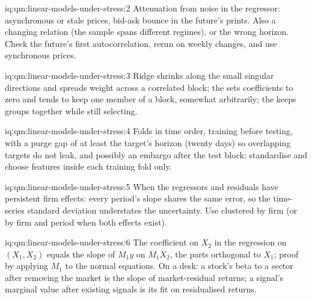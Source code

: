 \begin{solution}{iq:qm:linear-models-under-stress:2}
Attenuation from noise in the regressor: asynchronous or stale prices, bid-ask bounce in the future's prints. Also a changing relation (the
sample spans different regimes), or the wrong horizon. Check the future's first autocorrelation, rerun on weekly changes, and use synchronous
prices.
\end{solution}

\begin{solution}{iq:qm:linear-models-under-stress:3}
Ridge shrinks along the small singular directions and spreads weight across a correlated block; the  sets coefficients to zero and tends to
keep one member of a block, somewhat arbitrarily; the  keeps groups together while still selecting.
\end{solution}

\begin{solution}{iq:qm:linear-models-under-stress:4}
Folds in time order, training before testing, with a purge gap of at least the target's horizon (twenty days) so overlapping targets do not leak,
and possibly an embargo after the test block; standardise and choose features inside each training fold only.
\end{solution}

\begin{solution}{iq:qm:linear-models-under-stress:5}
When the regressors and residuals have persistent firm effects: every period's slope shares the same error, so the time-series standard deviation
understates the uncertainty. Use  clustered by firm (or by firm and period when both effects exist).
\end{solution}

\begin{solution}{iq:qm:linear-models-under-stress:6}
The coefficient on $X_2$ in the regression on $(X_1, X_2)$ equals the slope of $M_1y$ on $M_1X_2$, the parts orthogonal to $X_1$; proof by applying
$M_1$ to the normal equations. On a desk: a stock's beta to a sector after removing the market is the slope of market-residual returns; a signal's
marginal value after existing signals is its fit on residualised returns.
\end{solution}
